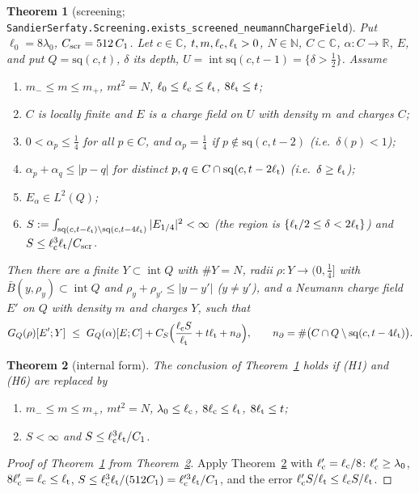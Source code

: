 \documentclass[11pt]{article}
\newtheorem{theorem}{Theorem}[section]
\theoremstyle{definition}
\theoremstyle{remark}
\newcommand{\R}{\mathbb R}
\newcommand{\C}{\mathbb C}
\newcommand{\N}{\mathbb N}
\newcommand{\dep}{\delta}
\newcommand{\sq}{\mathrm{sq}}
\newcommand{\lc}{\ell_{\rm c}}
\newcommand{\lt}{\ell_{\rm t}}
\begin{document}
\begin{theorem}[screening; \texttt{SandierSerfaty.Screening.exists\_screened\_neumannChargeField}]\label{thm:I4}
Put $\ell_0=8\lambda_0$, $C_{\rm scr}=512\,C_1$. Let $c\in\C$, $t,m,\lc,\lt>0$, $N\in\N$, $C\subset\C$, $\alpha:C\to\R$, $E$, and put
$Q=\sq(c,t)$, $\dep$ its depth, $U=\operatorname{int}\sq(c,t-1)=\{\dep>\frac12\}$. Assume
\begin{enumerate}[label=(H\arabic*)]
\item $m_-\le m\le m_+$, $mt^2=N$, $\ell_0\le\lc\le\lt$, $8\lt\le t$;
\item $C$ is locally finite and $E$ is a charge field on $U$ with density $m$ and charges $C$;
\item $0<\alpha_p\le\frac14$ for all $p\in C$, and $\alpha_p=\frac14$ if $p\notin\sq(c,t-2)$ (i.e.\ $\dep(p)<1$);
\item $\alpha_p+\alpha_q\le|p-q|$ for distinct $p,q\in C\cap\sq(c,t-2\lt)$ (i.e.\ $\dep\ge\lt$);
\item $E_\alpha\in L^2(Q)$;
\item $S:=\int_{\sq(c,t-\lt)\setminus\sq(c,t-4\lt)}|E_{1/4}|^2<\infty$ (the region is $\{\lt/2\le\dep<2\lt\}$) and $S\le\lc^3\lt/C_{\rm scr}$.
\end{enumerate}
Then there are a finite $Y\subset\operatorname{int}Q$ with $\#Y=N$, radii $\rho:Y\to(0,\frac14]$ with $\bar B(y,\rho_y)\subset\operatorname{int}Q$ and
$\rho_y+\rho_{y'}\le|y-y'|$ ($y\ne y'$), and a Neumann charge field $E'$ on $Q$ with density $m$ and charges $Y$, such that
\begin{equation}\label{eq:I4}
G_Q(\rho)[E';Y]\ \le\ G_Q(\alpha)[E;C]+C_S\Bigl(\frac{\lc S}{\lt}+t\lt+n_\partial\Bigr),\qquad n_\partial=\#\bigl(C\cap Q\setminus\sq(c,t-4\lt)\bigr).
\end{equation}
\end{theorem}

\begin{theorem}[internal form]\label{thm:I4int}
The conclusion of Theorem~\ref{thm:I4} holds if (H1) and (H6) are replaced by
\begin{enumerate}[label=(H\arabic*$'$)]
\item $m_-\le m\le m_+$, $mt^2=N$, $\lambda_0\le\lc$, $8\lc\le\lt$, $8\lt\le t$;
\setcounter{enumi}{5}
\item $S<\infty$ and $S\le\lc^3\lt/C_1$.
\end{enumerate}
\end{theorem}

\begin{proof}[Proof of Theorem~\ref{thm:I4} from Theorem~\ref{thm:I4int}]
Apply Theorem~\ref{thm:I4int} with $\lc'=\lc/8$: $\lc'\ge\lambda_0$, $8\lc'=\lc\le\lt$, $S\le\lc^3\lt/(512C_1)=\lc'^3\lt/C_1$, and the
error $\lc'S/\lt\le\lc S/\lt$.
\end{proof}
\end{document}
